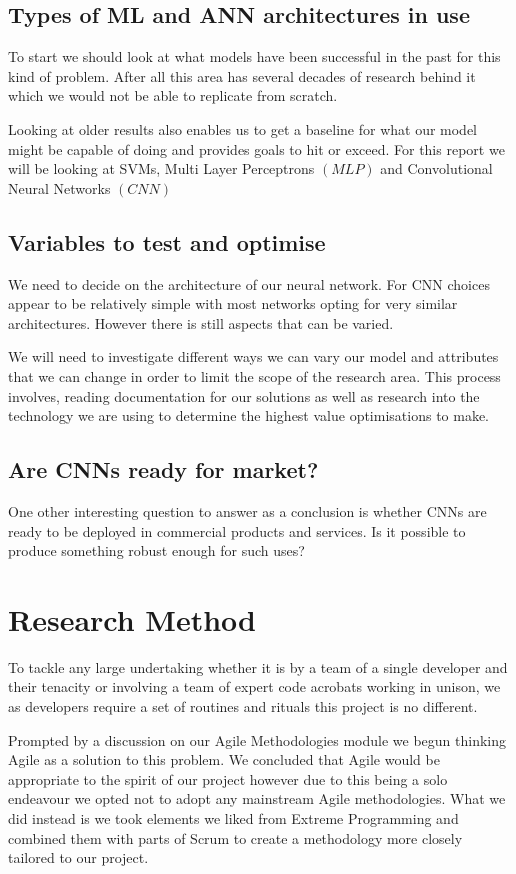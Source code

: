 \subsection{Types of ML and ANN architectures in use}
To start we should look at what models have been successful in the past for this kind of problem. After all this area has several decades of research behind it which we would not be able to replicate from scratch.

Looking at older results also enables us to get a baseline for what our model might be capable of doing and provides goals to hit or exceed. For this report we will be looking at SVMs, Multi Layer Perceptrons $\left(MLP\right)$ and Convolutional Neural Networks $\left(CNN\right)$

\subsection{Variables to test and optimise}
We need to decide on the architecture of our neural network. For CNN choices appear to be relatively simple with most networks opting for very similar architectures. However there is still aspects that can be varied.

We will need to investigate different ways we can vary our model and attributes that we can change in order to limit the scope of the research area. This process involves, reading documentation for our solutions as well as research into the technology we are using to determine the highest value optimisations to make.

\subsection{Are CNNs ready for market?}
One other interesting question to answer as a conclusion is whether CNNs are ready to be deployed in commercial products and services. Is it possible to produce something robust enough for such uses?

\section{Research Method}
To tackle any large undertaking whether it is by a team of a single developer and their tenacity or involving a team of expert code acrobats working in unison, we as developers require a set of routines and rituals this project is no different.

Prompted by a discussion on our Agile Methodologies module we begun thinking Agile as a solution to this problem. We concluded that Agile would be appropriate to the spirit of our project however due to this being a solo endeavour we opted not to adopt any mainstream Agile methodologies. What we did instead is we took elements we liked from Extreme Programming and combined them with parts of Scrum to create a methodology more closely tailored to our project.

